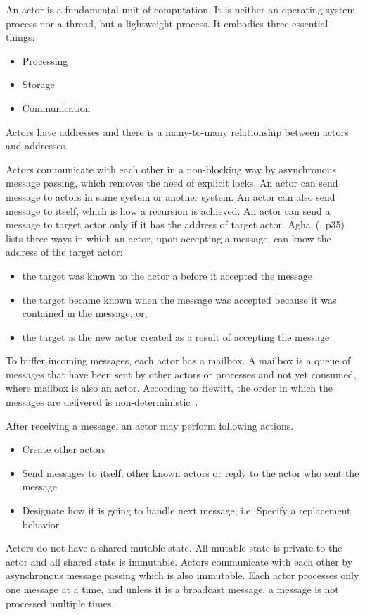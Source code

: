   An actor is a fundamental unit of computation. It is neither an operating system process nor a thread, but a lightweight process. It embodies three essential things:
\begin{itemize}
  \item Processing
  \item Storage
  \item Communication
\end{itemize}
  Actors have addresses and there is a many-to-many relationship between actors and addresses.

  Actors communicate with each other in a non-blocking way by asynchronous message passing, which removes the need of explicit locks. An actor can send message to actors in same system or another system. An actor can also send message to itself, which is how a recursion is achieved. An actor can send a message to target actor only if it has the address of target actor. Agha~(\cite{agha}, p35) lists three ways in which an actor, upon accepting a message, can know the address of the target actor:
  \begin{itemize}
    \item the target was known to the actor a before it accepted the message
    \item the target became known when the message was accepted because it was contained in the message, or,
    \item the target is the new actor created as a result of accepting the message
  \end{itemize}

  To buffer incoming messages, each actor has a mailbox. A mailbox is a queue of messages that have been sent by other actors or processes and not yet consumed, where mailbox is also an actor. According to Hewitt, the order in which the messages are delivered is non-deterministic~\cite{hewittVideo}.

After receiving a message, an actor may perform following actions.~\cite{hewitt}
\begin{itemize}
  \item Create other actors
  \item Send messages to itself, other known actors or reply to the actor who sent the message
  \item Designate how it is going to handle next message, i.e. Specify a replacement behavior
\end{itemize}

  Actors do not have a shared mutable state. All mutable state is private to the actor and all shared state is immutable. Actors communicate with each other by asynchronous message passing which is also immutable. Each actor processes only one message at a time, and unless it is a broadcast message, a message is not processed multiple times.

